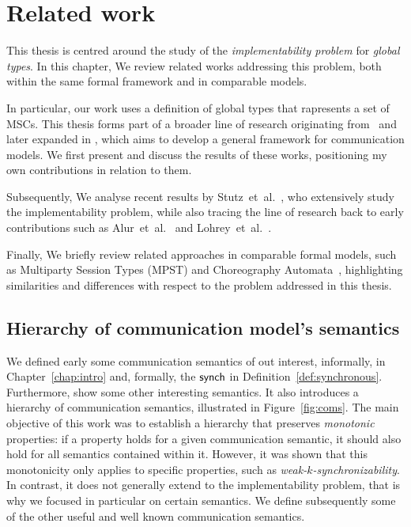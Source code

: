 \chapter{Related work}\label{sec:rel}
This thesis is centred around the study of the \emph{implementability 
problem} for \emph{global types}.
In this chapter, We review related works addressing this problem, 
both within the same formal framework and in comparable models.  

In particular, our work uses a definition of global types that rapresents
a set of MSCs. This thesis forms part of a broader line of research 
originating from~\cite{di2023partial} and later expanded in 
\cite{di2025realisability}, which aims to develop a general framework 
for communication models. We first present and discuss the results of 
these works, positioning my own contributions in relation to them.  

Subsequently, We analyse recent results by 
Stutz~et~al.~\cite{stutz2024implementability}, who extensively study 
the implementability problem, while also tracing the line of research 
back to early contributions such as Alur~et~al.~\cite{alur2000inference} 
and Lohrey~et~al.~\cite{lohrey2003realizability}.  

Finally, We briefly review related approaches in comparable formal 
models, such as Multiparty Session Types (MPST) and Choreography 
Automata~\cite{barbanera2020choreography}, highlighting similarities 
and differences with respect to the problem addressed in this thesis.

\section{Hierarchy of communication model's semantics}\label{sec:hier}
We defined early some communication semantics of out interest, informally, 
in Chapter~\ref{chap:intro} and, formally, the $\mathsf{synch}$ 
in Definition~\ref{def:synchronous}.
Furthermore, \cite{di2023partial} show some other interesting 
semantics. It also introduces a hierarchy of communication
semantics, illustrated in Figure~\ref{fig:coms}. The main objective of
this work was to establish a hierarchy that preserves \emph{monotonic}
properties: if a property holds for a given communication semantic, it
should also hold for all semantics contained within it. However, it was
shown that this monotonicity only applies to specific properties, such
as \emph{weak-$k$-synchronizability}. In contrast, it does not generally
extend to the implementability problem, that is why we focused in particular
on certain semantics. We define subsequently some of the other useful and
well known communication semantics.

